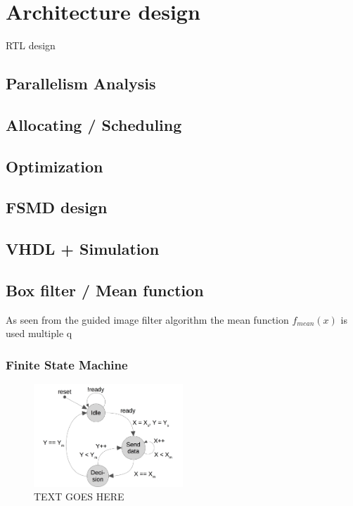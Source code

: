 \chapter{Architecture design} \label{ch:archdesign}

RTL design
\section{Parallelism Analysis}

\section{Allocating / Scheduling}

\section{Optimization}

\section{FSMD design}

\section{VHDL + Simulation}

\section*{Box filter / Mean function}
As seen from the guided image filter algorithm the mean function $f_{mean}(x)$ is used multiple q

\subsection*{Finite State Machine}
\begin{figure}
  \centering
  \includegraphics[width=0.5\textwidth]{figures/meanFSMv1.jpg}
  \caption{TEXT GOES HERE}
  \label{fig:LABEL}
\end{figure}

